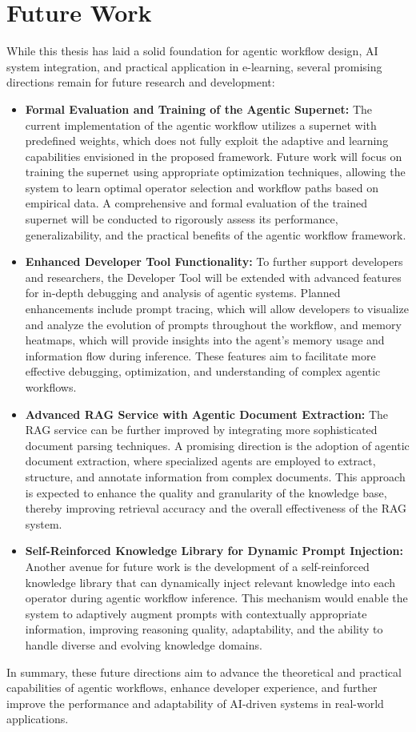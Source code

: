 \documentclass[../Main.tex]{subfiles}
\begin{document}
	\section{Future Work}
	\label{section:7.3_Future_work}
	While this thesis has laid a solid foundation for agentic workflow design, AI
	system integration, and practical application in e-learning, several promising
	directions remain for future research and development:
	\begin{itemize}
		\item \textbf{Formal Evaluation and Training of the Agentic Supernet:} The
			current implementation of the agentic workflow utilizes a supernet with
			predefined weights, which does not fully exploit the adaptive and learning
			capabilities envisioned in the proposed framework. Future work will focus
			on training the supernet using appropriate optimization techniques, allowing
			the system to learn optimal operator selection and workflow paths based on
			empirical data. A comprehensive and formal evaluation of the trained
			supernet will be conducted to rigorously assess its performance, generalizability,
			and the practical benefits of the agentic workflow framework.

		\item \textbf{Enhanced Developer Tool Functionality:} To further support
			developers and researchers, the Developer Tool will be extended with advanced
			features for in-depth debugging and analysis of agentic systems. Planned
			enhancements include prompt tracing, which will allow developers to visualize
			and analyze the evolution of prompts throughout the workflow, and memory
			heatmaps, which will provide insights into the agent's memory usage and information
			flow during inference. These features aim to facilitate more effective
			debugging, optimization, and understanding of complex agentic workflows.

		\item \textbf{Advanced RAG Service with Agentic Document Extraction:} The
			RAG service can be further improved by integrating more sophisticated
			document parsing techniques. A promising direction is the adoption of agentic
			document extraction, where specialized agents are employed to extract, structure,
			and annotate information from complex documents. This approach is expected
			to enhance the quality and granularity of the knowledge base, thereby
			improving retrieval accuracy and the overall effectiveness of the RAG
			system.

		\item \textbf{Self-Reinforced Knowledge Library for Dynamic Prompt Injection:}
			Another avenue for future work is the development of a self-reinforced
			knowledge library that can dynamically inject relevant knowledge into each
			operator during agentic workflow inference. This mechanism would enable the
			system to adaptively augment prompts with contextually appropriate information,
			improving reasoning quality, adaptability, and the ability to handle
			diverse and evolving knowledge domains.
	\end{itemize}
	In summary, these future directions aim to advance the theoretical and
	practical capabilities of agentic workflows, enhance developer experience, and
	further improve the performance and adaptability of AI-driven systems in real-world
	applications.
\end{document}

